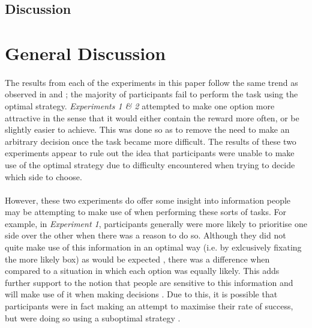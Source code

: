 \documentclass[12pt]{article}
\begin{document}
\subsection*{Discussion}


\section*{General Discussion}
\paragraph{} The results from each of the experiments in this paper follow the same trend as observed in \cite{clarke2015failure} and \cite{James2017}; the majority of participants fail to perform the task using the optimal strategy. \textit{Experiments 1 \& 2} attempted to make one option more attractive in the sense that it would either contain the reward more often, or be slightly easier to achieve. This was done so as to remove the need to make an arbitrary decision once the task became more difficult. The results of these two experiments appear to rule out the idea that participants were unable to make use of the optimal strategy due to difficulty encountered when trying to decide which side to choose. 

\paragraph{} However, these two experiments do offer some insight into information people may be attempting to make use of when performing these sorts of tasks. For example, in \textit{Experiment 1}, participants generally were more likely to prioritise one side over the other when there was a reason to do so. Although they did not quite make use of this information in an optimal way (i.e. by exlcusively fixating the more likely box) as would be expected \citep{koehler2014probability}, there was a difference when compared to a situation in which each option was equally likely. This adds further support to the notion that people are sensitive to this information and will make use of it when making decisions \citep{wolford2004searching,yellott1969probability}. Due to this, it is possible that participants were in fact making an attempt to maximise their rate of success, but were doing so using a suboptimal strategy \citep{Gao2015}.  
\end{document}
